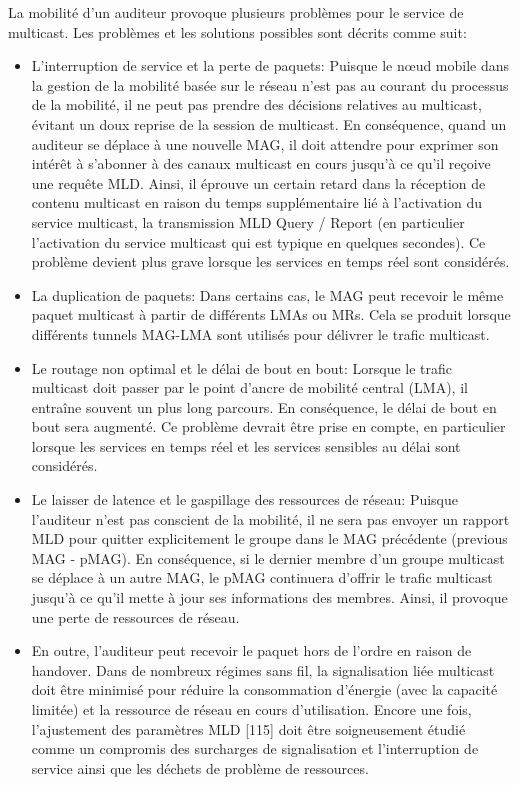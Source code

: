 La mobilité d'un auditeur provoque plusieurs problèmes pour le service de multicast. Les problèmes et les solutions possibles sont décrits comme suit:
\begin{itemize}
\item L'interruption de service et la perte de paquets: Puisque le nœud mobile dans la gestion de la mobilité basée sur le réseau n'est pas au courant du processus de la mobilité, il ne peut pas prendre des décisions relatives au multicast, évitant un doux reprise de la session de multicast. En conséquence, quand un auditeur se déplace à une nouvelle MAG, il doit attendre pour exprimer son intérêt à s'abonner à des canaux multicast en cours jusqu'à ce qu'il reçoive une requête MLD. Ainsi, il éprouve un certain retard dans la réception de contenu multicast en raison du temps supplémentaire lié à l'activation du service multicast, la transmission MLD Query / Report (en particulier l'activation du service multicast qui est typique en quelques secondes). Ce problème devient plus grave lorsque les services en temps réel sont considérés.
\item La duplication de paquets: Dans certains cas, le MAG peut recevoir le même paquet multicast à partir de différents LMAs ou MRs. Cela se produit lorsque différents tunnels MAG-LMA sont utilisés pour délivrer le trafic multicast.
\item Le routage non optimal et le délai de bout en bout: Lorsque le trafic multicast doit passer par le point d'ancre de mobilité central (LMA), il entraîne souvent un plus long parcours. En conséquence, le délai de bout en bout sera augmenté. Ce problème devrait être prise en compte, en particulier lorsque les services en temps réel et les services sensibles au délai sont considérés.
\item Le laisser de latence et le gaspillage des ressources de réseau: Puisque l'auditeur n'est pas conscient de la mobilité, il ne sera pas envoyer un rapport MLD pour quitter explicitement le groupe dans le MAG précédente (previous MAG - pMAG). En conséquence, si le dernier membre d'un groupe multicast se déplace à un autre MAG, le pMAG continuera d'offrir le trafic multicast jusqu'à ce qu'il mette à jour ses informations des membres. Ainsi, il provoque une perte de ressources de réseau.
\item En outre, l'auditeur peut recevoir le paquet hors de l'ordre en raison de handover. Dans de nombreux régimes sans fil, la signalisation liée multicast doit être minimisé pour réduire la consommation d'énergie (avec la capacité limitée) et la ressource de réseau en cours d'utilisation. Encore une fois, l'ajustement des paramètres MLD [115] doit être soigneusement étudié comme un compromis des surcharges de signalisation et l'interruption de service ainsi que les déchets de problème de ressources.
\end{itemize}


